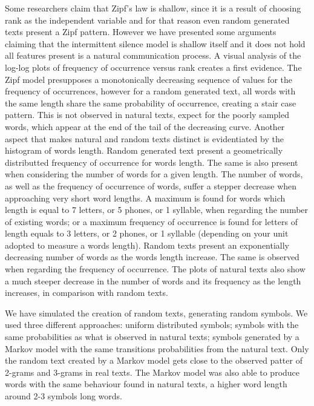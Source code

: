 Some researchers claim that Zipf's law is shallow, since it is a result of choosing 
rank as the independent variable and for that reason even random generated texts present 
a Zipf pattern. However we have presented some arguments claiming that the intermittent silence
model is shallow itself and it does not hold all features present is a natural communication
process. A visual analysis of the log-log plots of frequency of occurrence versus rank creates
a first evidence. The Zipf model presupposes a monotonically decreasing sequence of values
for the frequency of occurrences, however for a random generated text, all words with the 
same length share the same probability of occurrence, creating a stair case pattern.
This is not observed in natural texts, expect for the poorly sampled words, which
appear at the end of the tail of the decreasing curve.
Another aspect that makes natural and random texts distinct is evidentiated by
the histogram of words length. 
Random generated text present a geometrically distributted frequency of occurrence
for words length. The same is also present when considering the number of words for a given length.
The number of words, as well as the frequency of occurrence of words, suffer a 
stepper decrease when approaching very short word lengths. A maximum is found for words
which length is equal to 7 letters, or 5 phones, or 1 syllable, when regarding the
number of existing words; or a maximum frequency of occurrence is found for letters 
of length equals to 3 letters, or 2 phones, or 1 syllable (depending on your unit
adopted to measure a words length). Random texts present an exponentially decreasing
number of words as the words length increase. The same is observed when regarding 
the frequency of occurrence. The plots of natural texts also show a much steeper 
decrease in the number of words and its frequency as the length increases, in comparison 
with random texts. 

We have simulated the creation of random texts, generating random symbols. We used 
three different approaches: uniform distributed symbols; symbols with the same
probabilities as what is observed in natural texts; symbols generated by a Markov
model with the same transitions probabilities from the natural text. Only the
random text created by a Markov model gets close to the observed patter of
2-grams and 3-grams in real texts. The Markov model was also able to produce
words with the same behaviour found in natural texts, a higher word length around
2-3 symbols long words.

